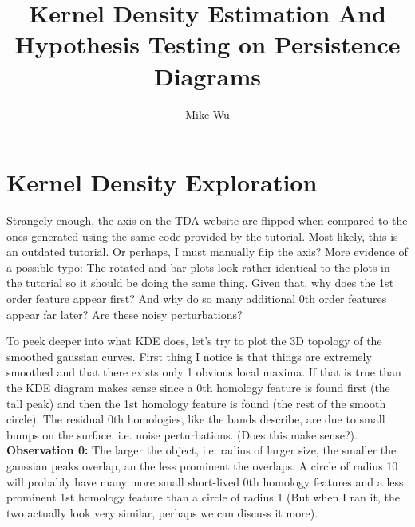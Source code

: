 \documentclass[a4paper]{article}
\title{Kernel Density Estimation And Hypothesis Testing on Persistence Diagrams}
\author{Mike Wu}
\begin{document}
\maketitle
\section{Kernel Density Exploration}
Strangely enough, the axis on the TDA website are flipped when compared to the ones generated using the same code provided by the tutorial. Most likely, this is an outdated tutorial. Or perhaps, I must manually flip the axis? More evidence of a possible typo: The rotated and bar plots look rather identical to the plots in the tutorial so it should be doing the same thing. Given that, why does the 1st order feature appear first? And why do so many additional 0th order features appear far later? Are these noisy perturbations? 

To peek deeper into what KDE does, let's try to plot the 3D topology of the smoothed gaussian curves.  First thing I notice is that things are extremely smoothed and that there exists only 1 obvious local maxima. If that is true than the KDE diagram makes sense since a 0th homology feature is found first (the tall peak) and then the 1st homology feature is found (the rest of the smooth circle). The residual 0th homologies, like the bands describe, are due to small bumps on the surface, i.e. noise perturbations. (Does this make sense?). \textbf{Observation 0: } The larger the object, i.e. radius of larger size, the smaller the gaussian peaks overlap, an the less prominent the overlaps. A circle of radius 10 will probably have many more small short-lived 0th homology features and a less prominent 1st homology feature than a circle of radius 1 (But when I ran it, the two actually look very similar, perhaps we can discuss it more). 
\end{document}
